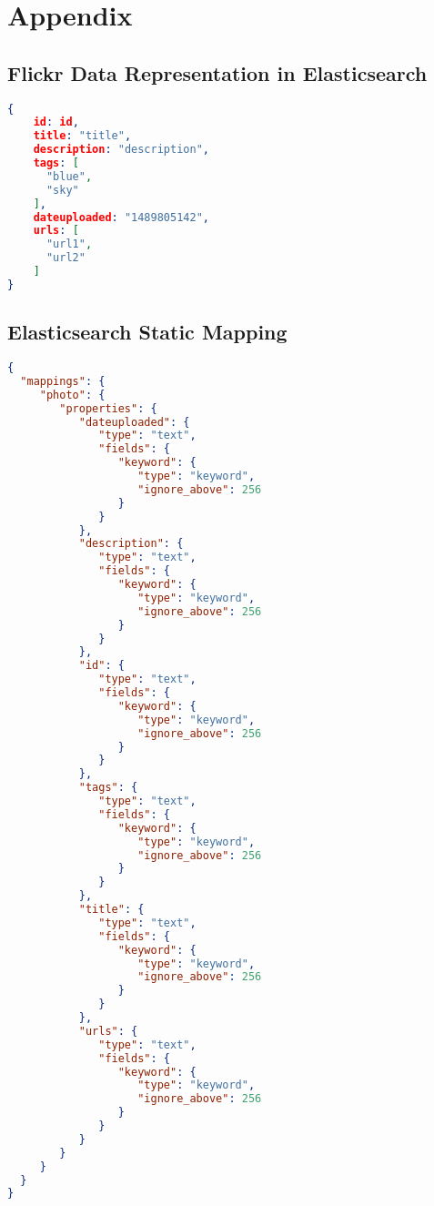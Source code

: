 \chapter{Appendix}
\section{Flickr Data Representation in Elasticsearch}
\begin{lstlisting}[language={json}, caption={Internal photo data representation in elasticsearch}, label={ap:flickr-data}]
{
    id: id,
    title: "title",
    description: "description",
    tags: [
      "blue",
      "sky"
    ],
    dateuploaded: "1489805142",
    urls: [
      "url1",
      "url2"
    ]
}
\end{lstlisting}

\section{Elasticsearch Static Mapping}
\begin{lstlisting}[language={json}, caption={The static Elasticsearch mapping used on the photo index in the experiment setup.}, label={ap:elasticsearch-mapping}]
{
  "mappings": {
     "photo": {
        "properties": {
           "dateuploaded": {
              "type": "text",
              "fields": {
                 "keyword": {
                    "type": "keyword",
                    "ignore_above": 256
                 }
              }
           },
           "description": {
              "type": "text",
              "fields": {
                 "keyword": {
                    "type": "keyword",
                    "ignore_above": 256
                 }
              }
           },
           "id": {
              "type": "text",
              "fields": {
                 "keyword": {
                    "type": "keyword",
                    "ignore_above": 256
                 }
              }
           },
           "tags": {
              "type": "text",
              "fields": {
                 "keyword": {
                    "type": "keyword",
                    "ignore_above": 256
                 }
              }
           },
           "title": {
              "type": "text",
              "fields": {
                 "keyword": {
                    "type": "keyword",
                    "ignore_above": 256
                 }
              }
           },
           "urls": {
              "type": "text",
              "fields": {
                 "keyword": {
                    "type": "keyword",
                    "ignore_above": 256
                 }
              }
           }
        }
     }
  }
}
\end{lstlisting}

